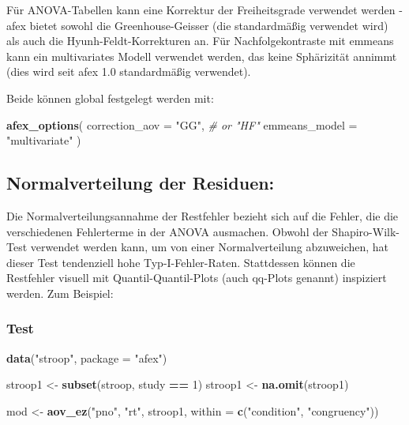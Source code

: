 \documentclass[
]{book}
\newenvironment{Shaded}{\begin{snugshade}}{\end{snugshade}}
\newcommand{\AttributeTok}[1]{\textcolor[rgb]{0.13,0.29,0.53}{#1}}
\newcommand{\CommentTok}[1]{\textcolor[rgb]{0.56,0.35,0.01}{\textit{#1}}}
\newcommand{\DecValTok}[1]{\textcolor[rgb]{0.00,0.00,0.81}{#1}}
\newcommand{\FunctionTok}[1]{\textcolor[rgb]{0.13,0.29,0.53}{\textbf{#1}}}
\newcommand{\NormalTok}[1]{#1}
\newcommand{\OtherTok}[1]{\textcolor[rgb]{0.56,0.35,0.01}{#1}}
\newcommand{\SpecialCharTok}[1]{\textcolor[rgb]{0.81,0.36,0.00}{\textbf{#1}}}
\newcommand{\StringTok}[1]{\textcolor[rgb]{0.31,0.60,0.02}{#1}}
\begin{document}
Für ANOVA-Tabellen kann eine Korrektur der Freiheitsgrade verwendet werden - afex bietet sowohl die Greenhouse-Geisser (die standardmäßig verwendet wird) als auch die Hyunh-Feldt-Korrekturen an.
Für Nachfolgekontraste mit emmeans kann ein multivariates Modell verwendet werden, das keine Sphärizität annimmt (dies wird seit afex 1.0 standardmäßig verwendet).

Beide können global festgelegt werden mit:

\begin{Shaded}
\begin{Highlighting}[]
\FunctionTok{afex\_options}\NormalTok{(}
  \AttributeTok{correction\_aov =} \StringTok{"GG"}\NormalTok{, }\CommentTok{\# or "HF"}
  \AttributeTok{emmeans\_model =} \StringTok{"multivariate"}
\NormalTok{)}
\end{Highlighting}
\end{Shaded}

\subsection{Normalverteilung der Residuen:}\label{normalverteilung-der-residuen}

Die Normalverteilungsannahme der Restfehler bezieht sich auf die Fehler, die die verschiedenen Fehlerterme in der ANOVA ausmachen. Obwohl der Shapiro-Wilk-Test verwendet werden kann, um von einer Normalverteilung abzuweichen, hat dieser Test tendenziell hohe Typ-I-Fehler-Raten. Stattdessen können die Restfehler visuell mit Quantil-Quantil-Plots (auch qq-Plots genannt) inspiziert werden. Zum Beispiel:

\subsubsection{Test}\label{test-2}

\begin{Shaded}
\begin{Highlighting}[]
\FunctionTok{data}\NormalTok{(}\StringTok{"stroop"}\NormalTok{, }\AttributeTok{package =} \StringTok{"afex"}\NormalTok{)}

\NormalTok{stroop1 }\OtherTok{\textless{}{-}} \FunctionTok{subset}\NormalTok{(stroop, study }\SpecialCharTok{==} \DecValTok{1}\NormalTok{)}
\NormalTok{stroop1 }\OtherTok{\textless{}{-}} \FunctionTok{na.omit}\NormalTok{(stroop1)}

\NormalTok{mod }\OtherTok{\textless{}{-}} \FunctionTok{aov\_ez}\NormalTok{(}\StringTok{"pno"}\NormalTok{, }\StringTok{"rt"}\NormalTok{, stroop1,}
             \AttributeTok{within =} \FunctionTok{c}\NormalTok{(}\StringTok{"condition"}\NormalTok{, }\StringTok{"congruency"}\NormalTok{))}
\end{Highlighting}
\end{Shaded}
\end{document}
